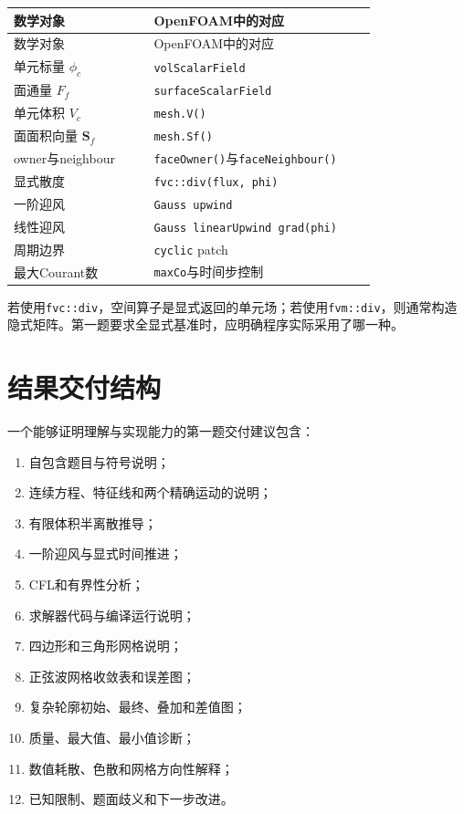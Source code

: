 \documentclass[UTF8,12pt,a4paper,fontset=fandol]{ctexart}
\numberwithin{equation}{section}
\newcommand{\Sf}{\bm S}
\begin{document}
\begin{longtable}{L{0.34\linewidth}L{0.54\linewidth}}
\toprule
数学对象 & OpenFOAM中的对应\\
\midrule
\endfirsthead
\toprule
数学对象 & OpenFOAM中的对应\\
\midrule
\endhead
单元标量 $\phi_c$ & \texttt{volScalarField}\\
面通量 $F_f$ & \texttt{surfaceScalarField}\\
单元体积 $V_c$ & \texttt{mesh.V()}\\
面面积向量 $\Sf_f$ & \texttt{mesh.Sf()}\\
owner与neighbour & \texttt{faceOwner()}与\texttt{faceNeighbour()}\\
显式散度 & \texttt{fvc::div(flux, phi)}\\
一阶迎风 & \texttt{Gauss upwind}\\
线性迎风 & \texttt{Gauss linearUpwind grad(phi)}\\
周期边界 & \texttt{cyclic} patch\\
最大Courant数 & \texttt{maxCo}与时间步控制\\
\bottomrule
\end{longtable}

若使用\texttt{fvc::div}，空间算子是显式返回的单元场；若使用\texttt{fvm::div}，则通常构造隐式矩阵。第一题要求全显式基准时，应明确程序实际采用了哪一种。

\section{结果交付结构}

一个能够证明理解与实现能力的第一题交付建议包含：

\begin{enumerate}
  \item 自包含题目与符号说明；
  \item 连续方程、特征线和两个精确运动的说明；
  \item 有限体积半离散推导；
  \item 一阶迎风与显式时间推进；
  \item CFL和有界性分析；
  \item 求解器代码与编译运行说明；
  \item 四边形和三角形网格说明；
  \item 正弦波网格收敛表和误差图；
  \item 复杂轮廓初始、最终、叠加和差值图；
  \item 质量、最大值、最小值诊断；
  \item 数值耗散、色散和网格方向性解释；
  \item 已知限制、题面歧义和下一步改进。
\end{enumerate}
\end{document}
